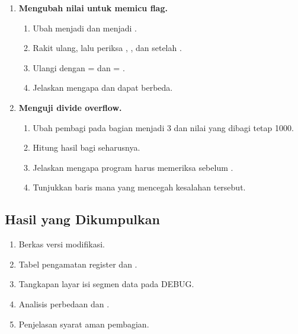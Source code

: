 \begin{enumerate}
    \item \textbf{Mengubah nilai untuk memicu flag.}
    \begin{enumerate}
        \item Ubah  menjadi  dan 
              menjadi .
        \item Rakit ulang, lalu periksa , , dan
               setelah .
        \item Ulangi dengan  =  dan
               = .
        \item Jelaskan mengapa  dan  dapat berbeda.
    \end{enumerate}

    \item \textbf{Menguji divide overflow.}
    \begin{enumerate}
        \item Ubah pembagi pada bagian  menjadi 3 dan
              nilai yang dibagi tetap 1000.
        \item Hitung hasil bagi seharusnya.
        \item Jelaskan mengapa program harus memeriksa 
              sebelum .
        \item Tunjukkan baris mana yang mencegah kesalahan tersebut.
    \end{enumerate}
\end{enumerate}

\subsection{Hasil yang Dikumpulkan}

\begin{enumerate}
    \item Berkas  versi modifikasi.
    \item Tabel pengamatan register dan .
    \item Tangkapan layar isi segmen data pada DEBUG.
    \item Analisis perbedaan  dan .
    \item Penjelasan syarat aman pembagian.
\end{enumerate}

